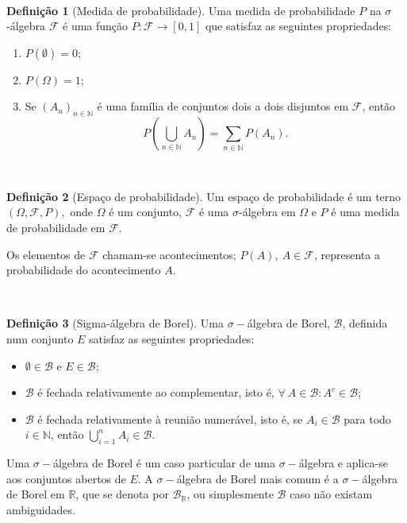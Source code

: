 \documentclass[
  11pt,
  a4paper,
]{book}
\theoremstyle{definition}
\newtheorem{definition}{Definição}[chapter]
\theoremstyle{definition}
\theoremstyle{definition}
\theoremstyle{definition}
\theoremstyle{remark}
\begin{document}
\(\,\)

\begin{definition}[Medida de probabilidade]

Uma medida de probabilidade \(P\) na \(\sigma\)-álgebra \(\mathcal{F}\) é uma função \(P: \mathcal{F} \rightarrow [0,1]\) que satisfaz as seguintes propriedades:

\begin{enumerate}
\def\labelenumi{\roman{enumi})}
\item
  \(P(\emptyset) = 0\);
\item
  \(P(\Omega) = 1\);
\item
  Se \((A_n)_{n \in \mathbb{N}}\) é uma família de conjuntos dois a dois disjuntos em \(\mathcal{F}\), então
  \[P\left(\bigcup_{n \in \mathbb{N}}{A_n}\right)=\sum_{n \in \mathbb{N}}{P(A_n)}.\]
\end{enumerate}

\end{definition}

\(\,\)

\begin{definition}[Espaço de probabilidade]
Um espaço de probabilidade é um terno \((\Omega,\mathcal{F},P),\) onde \(\Omega\) é um conjunto, \(\mathcal{F}\) é uma \(\sigma\)-álgebra em \(\Omega\) e \(P\) é uma medida de probabilidade em \(\mathcal{F}\).

Os elementos de \(\mathcal{F}\) chamam-se acontecimentos; \(P(A), ~A \in \mathcal{F}\), representa a probabilidade do acontecimento \(A\).
\end{definition}

\(\,\)

\begin{definition}[Sigma-álgebra de Borel]
Uma \(\sigma-\)álgebra de Borel, \(\mathcal{B}\), definida num conjunto \(E\) satisfaz as seguintes propriedades:

\begin{itemize}
\item
  \(\emptyset \in \mathcal{B}\) e \(E \in \mathcal{B}\);
\item
  \(\mathcal{B}\) é fechada relativamente ao complementar, isto é,
  \(\forall ~ A \in \mathcal{B}: A^c \in \mathcal{B}\);
\item
  \(\mathcal{B}\) é fechada relativamente à reunião numerável, isto é, se \(A_i \in \mathcal{B}\) para todo \(i \in \mathbb{N}\), então \(\bigcup\limits_{i=1}^{n} A_i \in \mathcal{B}\).
\end{itemize}

Uma \(\sigma-\)álgebra de Borel é um caso particular de uma \(\sigma-\)álgebra e aplica-se aos conjuntos abertos de \(E\). A \(\sigma-\)álgebra de Borel mais comum é a \(\sigma-\)álgebra de Borel em \(\mathbb{R}\), que se denota por \(\mathcal{B}_{\mathbb{R}}\), ou simplesmente \(\mathcal{B}\) caso não existam ambiguidades.
\end{definition}
\end{document}
